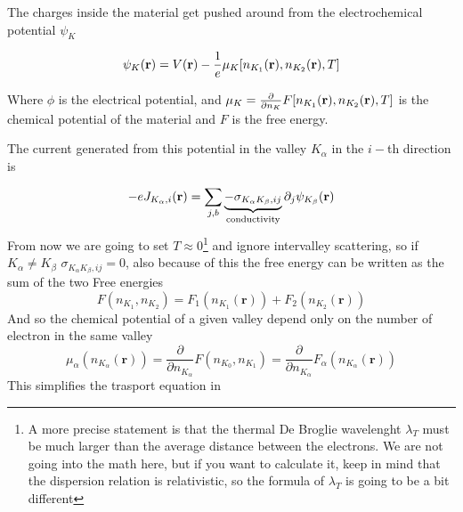 The charges inside the material get pushed around from the electrochemical potential $\psi_K$


\begin{equation}
    \psi_{K}(\mathbf{r})= V(\mathbf{r})-\frac 1e \mu_K[n_{K_1}(\mathbf{r}),n_{K_2}(\mathbf{r}),T]
\end{equation}

Where $\phi$ is the electrical potential, and $\mu_K=\frac {\partial}{\partial n_{K}}F[n_{K_1}(\mathbf{r}),n_{K_2}(\mathbf{r}),T]$ is the chemical potential of the material and $F$ is the free energy.

The current generated from this potential in the valley $K_\alpha$ in the $i-$th direction is

\begin{equation}
    -eJ_{K_\alpha,i}(\mathbf{r})= \sum_{j,b} \underbrace{-\sigma_{K_\alpha K_\beta ,ij}}_{\textrm{conductivity}}\partial_j\psi_{K_\beta }(\mathbf{r})
\end{equation}
From now we are going to set $T\approx 0$\footnote{A more precise statement is that the thermal De Broglie wavelenght $\lambda_T$ must be much larger than the average distance between the electrons. We are not going into the math here, but if you want to calculate it, keep in mind that the dispersion relation is relativistic, so the formula of $\lambda_T$ is going to be a bit different}
and ignore intervalley scattering, so if $K_\alpha \neq K_\beta $ $\sigma_{K_\alpha K_\beta ,ij}=0$, also because of this the free energy can be written as the sum of the two Free energies
\begin{equation}
    F(n_{K_1},n_{K_2})=F_1(n_{K_1}(\mathbf r))+F_2(n_{K_2}(\mathbf r))
\end{equation}
And so the chemical potential of a given valley depend only on the number of electron in the same valley
\begin{equation}
    \mu_\alpha(n_{K_\alpha}(\mathbf r))=\frac{\partial}{\partial n_{K_\alpha}}F(n_{K_0},n_{K_1})=\frac{\partial}{\partial n_{K_\alpha}}F_\alpha(n_{K_\alpha}(\mathbf r))
\end{equation}
This simplifies the trasport equation in 

